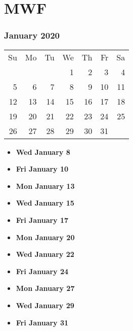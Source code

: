 \documentclass[11pt]{article}
\begin{document}
\section{MWF}
\subsubsection*{January 2020}
\begin{tabular}{rrrrrrr}
Su & Mo & Tu & We & Th & Fr & Sa\\
   &    &    &  1 &  2 &  3 &  4\\ 
 5 &  6 &  7 &  8 &  9 & 10 & 11\\ 
12 & 13 & 14 & 15 & 16 & 17 & 18\\ 
19 & 20 & 21 & 22 & 23 & 24 & 25\\ 
26 & 27 & 28 & 29 & 30 & 31 &\\
\end{tabular}

\begin{itemize}
\item\textbf{Wed January  8}
\item\textbf{Fri January 10}
\item\textbf{Mon January 13}
\item\textbf{Wed January 15}
\item\textbf{Fri January 17}
\item\textbf{Mon January 20} 
\item\textbf{Wed January 22}
\item\textbf{Fri January 24}
\item\textbf{Mon January 27}
\item\textbf{Wed January 29}
\item\textbf{Fri January 31}
\end{itemize}
\hrulefill
\end{document}
